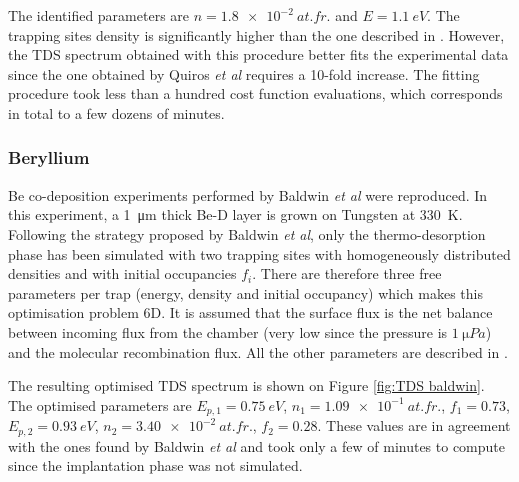 The identified parameters are $n = \SI{1.8e-2}{at.fr.}$ and $E =\SI{1.1}{eV}$.
The trapping sites density is significantly higher than the one described in \cite{quiros_blister_2017}.
However, the TDS spectrum obtained with this procedure better fits the experimental data since the one obtained by Quiros \textit{et al} requires a 10-fold increase.
The fitting procedure took less than a hundred cost function evaluations, which corresponds in total to a few dozens of minutes.

\subsubsection{Beryllium}
Be co-deposition experiments performed by Baldwin \textit{et al}  were reproduced.
In this experiment, a \SI{1}{\micro m} thick Be-D layer is grown on Tungsten at \SI{330}{K}. 
Following the strategy proposed by Baldwin \textit{et al}, only the thermo-desorption phase has been simulated with two trapping sites with homogeneously distributed densities and with initial occupancies $f_i$.
There are therefore three free parameters per trap (energy, density and initial occupancy) which makes this optimisation problem 6D.
It is assumed that the surface flux is the net balance between incoming flux from the chamber (very low since the pressure is $\SI{1}{\micro Pa}$) and the molecular recombination flux.
All the other parameters are described in \cite{baldwin_experimental_2014}.

The resulting optimised TDS spectrum is shown on Figure \ref{fig:TDS baldwin}.
The optimised parameters are $E_{p, 1} = \SI{0.75}{eV}$, $n_1 = \SI{1.09e-1}{at.fr.}$, $f_1=0.73$, $E_{p, 2} = \SI{0.93}{eV}$, \newline ${n_2 = \SI{3.40e-2}{at.fr.}}$, $f_2=0.28$.
These values are in agreement with the ones found by Baldwin \textit{et al} \cite{baldwin_experimental_2014} and took only a few of minutes to compute since the implantation phase was not simulated.

